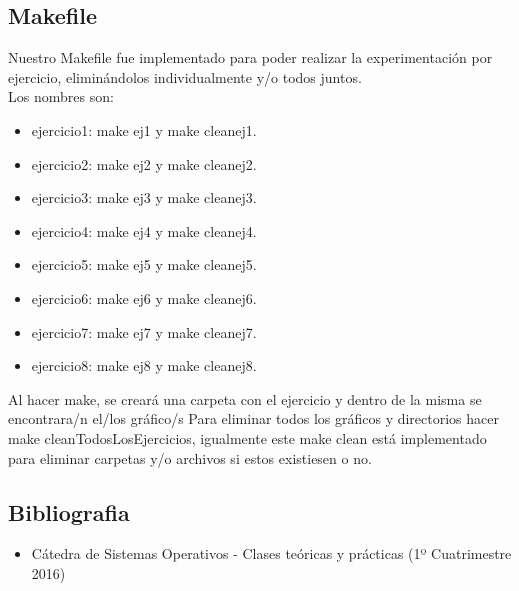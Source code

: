 
\subsection{Makefile}

Nuestro Makefile fue implementado para poder realizar la experimentaci\'on por ejercicio, elimin\'{a}ndolos individualmente y/o todos juntos.\\
Los nombres son:\\
\begin{itemize}
 \item ejercicio1: make ej1 y make cleanej1.
 \item ejercicio2: make ej2 y make cleanej2.
 \item ejercicio3: make ej3 y make cleanej3.
 \item ejercicio4: make ej4 y make cleanej4.
 \item ejercicio5: make ej5 y make cleanej5.
 \item ejercicio6: make ej6 y make cleanej6.
 \item ejercicio7: make ej7 y make cleanej7.
 \item ejercicio8: make ej8 y make cleanej8.
\end{itemize}

Al hacer make, se crear\'a una carpeta con el ejercicio y dentro de la misma se encontrara/n el/los gr\'afico/s
Para eliminar todos los gr\'aficos y directorios hacer make cleanTodosLosEjercicios, igualmente este make clean est\'a implementado
para eliminar carpetas y/o archivos si estos existiesen o no.\\

\subsection{Bibliografia}

\begin{itemize}
 \item C\'atedra de Sistemas Operativos - Clases te\'oricas y pr\'acticas (1º Cuatrimestre 2016)
 \end{itemize}
